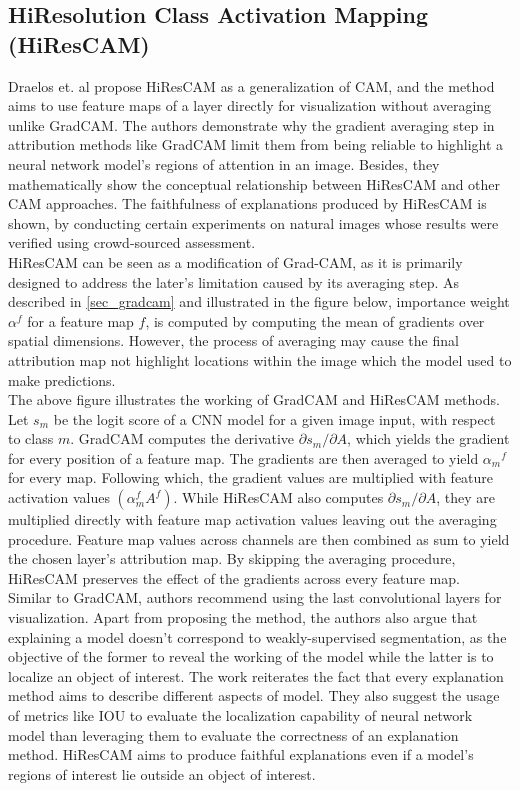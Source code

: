 \documentclass[../report.tex]{subfiles}
\begin{document}
\subsection{HiResolution Class Activation Mapping (HiResCAM)}
	Draelos et. al propose HiResCAM \cite{draelos2020hirescam} as a generalization of CAM, and the method aims to use feature maps of a layer directly for visualization without averaging unlike GradCAM. The authors demonstrate why the gradient averaging step in attribution methods like GradCAM limit them from being reliable to highlight a neural network model’s regions of attention in an image. Besides, they mathematically show the conceptual relationship between HiResCAM and other CAM approaches. The faithfulness of explanations produced by HiResCAM is shown, by conducting certain experiments on natural images whose results were verified using crowd-sourced assessment.\\
	HiResCAM can be seen as a modification of Grad-CAM, as it is primarily designed to address the later’s limitation caused by its averaging step. As described in \ref{sec_gradcam} and illustrated in the figure below, importance weight $\alpha^f$ for a feature map $f$, is computed by computing the mean of gradients over spatial dimensions. However, the process of averaging may cause the final attribution map not highlight locations within the image which the model used to make predictions.\\
	The above figure illustrates the working of GradCAM and HiResCAM methods. Let $s_m$ be the logit score of a CNN model for a given image input, with respect to class $m$. GradCAM computes the derivative $\partial s_m / \partial A$, which yields the gradient for every position of a feature map. The gradients are then averaged to yield ${\alpha_m}^f$ for every map. Following which, the gradient values are multiplied with feature activation values $(\alpha_m^f A^f)$. While HiResCAM also computes  $\partial s_m / \partial A$, they are multiplied directly with feature map activation values leaving out the averaging procedure. Feature map values across channels are then combined as sum to yield the chosen layer’s attribution map. By skipping the averaging procedure, HiResCAM preserves the effect of the gradients across every feature map.\\
	Similar to GradCAM, authors recommend using the last convolutional layers for visualization. Apart from proposing the method, the authors also argue that explaining a model doesn’t correspond to weakly-supervised segmentation, as the objective of the former to reveal the working of the model while the latter is to localize an object of interest. The work reiterates the fact that every explanation method aims to describe different aspects of model. They also suggest the usage of metrics like IOU to evaluate the localization capability of neural network model than leveraging them to evaluate the correctness of an explanation method. HiResCAM aims to produce faithful explanations even if a model’s regions of interest lie outside an object of interest.\\
\end{document}
